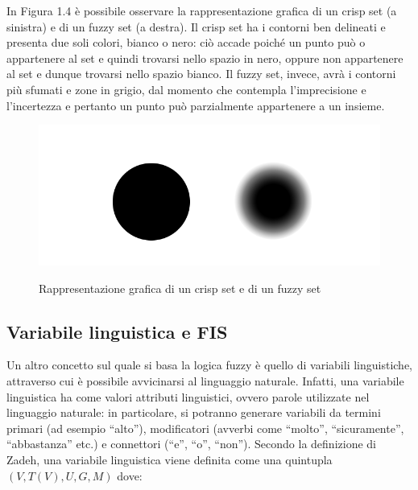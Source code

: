 \documentclass[11pt,  oneside, openany]{book}
\begin{document}
In Figura 1.4 è possibile osservare la rappresentazione grafica di un crisp set (a sinistra) e di un fuzzy set (a destra). Il crisp set ha i contorni ben delineati e presenta due soli colori, bianco o nero: ciò accade poiché un punto può o appartenere al set e quindi trovarsi nello spazio in nero, oppure non appartenere al set e dunque trovarsi nello spazio bianco. Il fuzzy set, invece, avrà i contorni più sfumati e zone in grigio, dal momento che contempla l'imprecisione e l'incertezza e pertanto un punto può parzialmente appartenere a un insieme. 

\begin{figure}[h!]
\begin{center}
  \includegraphics[width=13cm]{Immagini/fuzzyvscrisp.png}\\
  \caption{Rappresentazione grafica di un crisp set e di un fuzzy set}
\end{center}
\end{figure}



\subsection{Variabile linguistica e FIS}


Un altro concetto sul quale si basa la logica fuzzy è quello di variabili linguistiche, attraverso cui è possibile avvicinarsi al linguaggio naturale. Infatti, una variabile linguistica ha come valori attributi linguistici, ovvero parole utilizzate nel linguaggio naturale: in particolare, si potranno generare variabili da termini primari (ad esempio ``alto''), modificatori (avverbi come ``molto'', ``sicuramente'', ``abbastanza'' etc.)  e connettori (``e'', ``o'', ``non''). Secondo la definizione di Zadeh, una variabile linguistica viene definita come una quintupla $(V, T(V), U, G, M)$ dove: 
\end{document}
